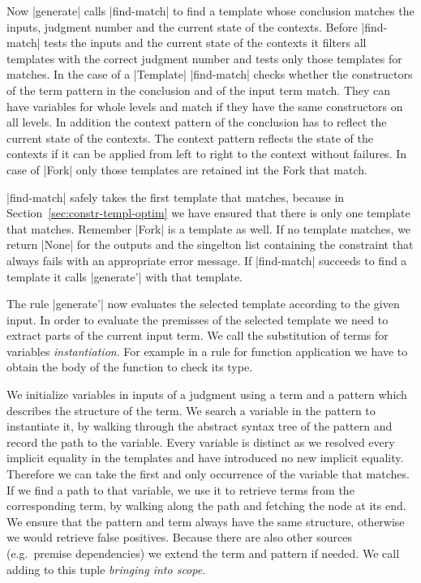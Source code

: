 Now \code|generate| calls \code|find-match| to find a template whose
conclusion matches the inputs, judgment number and the current state
of the contexts. Before \code|find-match| tests the inputs and the
current state of the contexts it filters all templates with the
correct judgment number and tests only those templates for matches. In
the case of a \code|Template| \code|find-match| checks whether the
constructors of the term pattern in the conclusion and of the input
term match. They can have variables for whole levels and match if they
have the same constructors on all levels. In addition the context
pattern of the conclusion has to reflect the current state of the
contexts. The context pattern reflects the state of the contexts if it
can be applied from left to right to the context without failures. In
case of \code|Fork| only those templates are retained int the Fork
that match.

\begin{example}
  \todo[inline]{}
\end{example}

\code|find-match| safely takes the first template that matches,
because in Section~\ref{sec:constr-templ-optim} we have ensured that
there is only one template that matches. Remember \code|Fork| is a
template as well. If no template matches, we return \code|None| for
the outputs and the singelton list containing the constraint that
always fails with an appropriate error message. If \code|find-match|
succeeds to find a template it calls \code|generate'| with that
template.

The rule \code|generate'| now evaluates the selected template
according to the given input. In order to evaluate the premisses of
the selected template we need to extract parts of the current input
term. We call the substitution of terms for variables
\emph{instantiation}. For example in a rule for function application
we have to obtain the body of the function to check its type.

We initialize variables in inputs of a judgment using a term and a
pattern which describes the structure of the term. We search a
variable in the pattern to instantiate it, by walking through the
abstract syntax tree of the pattern and record the path to the
variable. Every variable is distinct as we resolved every implicit
equality in the templates and have introduced no new implicit
equality. Therefore we can take the first and only occurrence of the
variable that matches. If we find a path to that variable, we use it
to retrieve terms from the corresponding term, by walking along the
path and fetching the node at its end. We ensure that the pattern and
term always have the same structure, otherwise we would retrieve false
positives. Because there are also other sources (e.g.\ premise
dependencies) we extend the term and pattern if needed. We call adding
to this tuple \emph{bringing into scope}.

